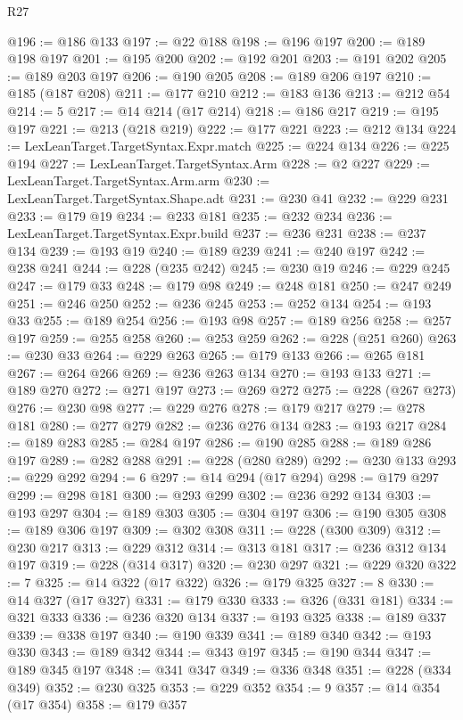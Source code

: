 \begin{lexlean}{R27}
\begin{coremodule}
@196 := @186 @133
@197 := @22 @188
@198 := @196 @197
@200 := @189 @198 @197
@201 := @195 @200
@202 := @192 @201
@203 := @191 @202
@205 := @189 @203 @197
@206 := @190 @205
@208 := @189 @206 @197
@210 := @185 (@187 @208)
@211 := @177 @210
@212 := @183 @136
@213 := @212 @54
@214 := 5
@217 := @14 @214 (@17 @214)
@218 := @186 @217
@219 := @195 @197
@221 := @213 (@218 @219)
@222 := @177 @221
@223 := @212 @134
@224 := LexLeanTarget.TargetSyntax.Expr.match
@225 := @224 @134
@226 := @225 @194
@227 := LexLeanTarget.TargetSyntax.Arm
@228 := @2 @227
@229 := LexLeanTarget.TargetSyntax.Arm.arm
@230 := LexLeanTarget.TargetSyntax.Shape.adt
@231 := @230 @41
@232 := @229 @231
@233 := @179 @19
@234 := @233 @181
@235 := @232 @234
@236 := LexLeanTarget.TargetSyntax.Expr.build
@237 := @236 @231
@238 := @237 @134
@239 := @193 @19
@240 := @189 @239
@241 := @240 @197
@242 := @238 @241
@244 := @228 (@235 @242)
@245 := @230 @19
@246 := @229 @245
@247 := @179 @33
@248 := @179 @98
@249 := @248 @181
@250 := @247 @249
@251 := @246 @250
@252 := @236 @245
@253 := @252 @134
@254 := @193 @33
@255 := @189 @254
@256 := @193 @98
@257 := @189 @256
@258 := @257 @197
@259 := @255 @258
@260 := @253 @259
@262 := @228 (@251 @260)
@263 := @230 @33
@264 := @229 @263
@265 := @179 @133
@266 := @265 @181
@267 := @264 @266
@269 := @236 @263 @134
@270 := @193 @133
@271 := @189 @270
@272 := @271 @197
@273 := @269 @272
@275 := @228 (@267 @273)
@276 := @230 @98
@277 := @229 @276
@278 := @179 @217
@279 := @278 @181
@280 := @277 @279
@282 := @236 @276 @134
@283 := @193 @217
@284 := @189 @283
@285 := @284 @197
@286 := @190 @285
@288 := @189 @286 @197
@289 := @282 @288
@291 := @228 (@280 @289)
@292 := @230 @133
@293 := @229 @292
@294 := 6
@297 := @14 @294 (@17 @294)
@298 := @179 @297
@299 := @298 @181
@300 := @293 @299
@302 := @236 @292 @134
@303 := @193 @297
@304 := @189 @303
@305 := @304 @197
@306 := @190 @305
@308 := @189 @306 @197
@309 := @302 @308
@311 := @228 (@300 @309)
@312 := @230 @217
@313 := @229 @312
@314 := @313 @181
@317 := @236 @312 @134 @197
@319 := @228 (@314 @317)
@320 := @230 @297
@321 := @229 @320
@322 := 7
@325 := @14 @322 (@17 @322)
@326 := @179 @325
@327 := 8
@330 := @14 @327 (@17 @327)
@331 := @179 @330
@333 := @326 (@331 @181)
@334 := @321 @333
@336 := @236 @320 @134
@337 := @193 @325
@338 := @189 @337
@339 := @338 @197
@340 := @190 @339
@341 := @189 @340
@342 := @193 @330
@343 := @189 @342
@344 := @343 @197
@345 := @190 @344
@347 := @189 @345 @197
@348 := @341 @347
@349 := @336 @348
@351 := @228 (@334 @349)
@352 := @230 @325
@353 := @229 @352
@354 := 9
@357 := @14 @354 (@17 @354)
@358 := @179 @357

\end{coremodule}
\end{lexlean}
